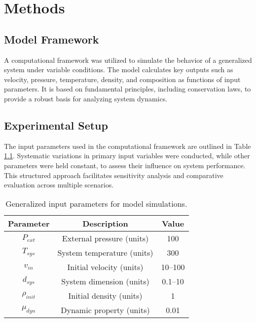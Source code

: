 \chapter{Methods}

\fancyfoot[C]{\thepage}

\section{Model Framework}
A computational framework was utilized to simulate the behavior of a generalized system under variable conditions. The model calculates key outputs such as velocity, pressure, temperature, density, and composition as functions of input parameters. It is based on fundamental principles, including conservation laws, to provide a robust basis for analyzing system dynamics.

\section{Experimental Setup}
The input parameters used in the computational framework are outlined in Table \ref{table: model inputs}. Systematic variations in primary input variables were conducted, while other parameters were held constant, to assess their influence on system performance. This structured approach facilitates sensitivity analysis and comparative evaluation across multiple scenarios.

\begin{table}[h!]
\centering
\begin{tabular}{|c c c|}
\hline
Parameter & Description & Value \\ [0.5ex]
\hline
$P_{ext}$ & External pressure (units) & 100 \\ [6pt]
$T_{sys}$ & System temperature (units) & 300 \\ [6pt]
$v_{in}$ & Initial velocity (units) & 10--100 \\ [6pt]
$d_{sys}$ & System dimension (units) & 0.1--10 \\ [6pt]
$\rho_{init}$ & Initial density (units) & 1 \\ [6pt]
$\mu_{dyn}$ & Dynamic property (units) & 0.01 \\ [1ex]
\hline
\end{tabular}
\caption[Input Parameters for Model Simulations]{Generalized input parameters for model simulations.}
\label{table: model inputs}
\end{table}


